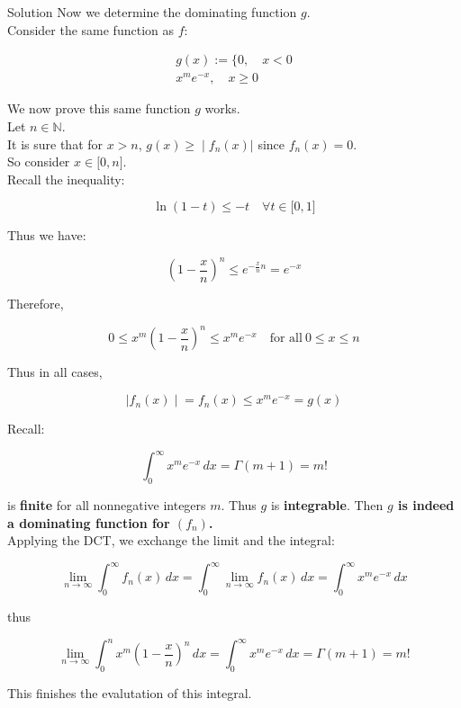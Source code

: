 \begin{qlsolution}{Solution}
Now we determine the dominating function \(g\).\\
Consider the same function as \(f\):

\[\begin{matrix}
{g(x) := \{ 0,\quad x < 0} \\
{x^{m}e^{- x},\quad x \geq 0}
\end{matrix}\]

We now prove this same function \(g\) works.\\
Let \(n \in \mathbb{N}\).\\
It is sure that for \(x > n\), \(\left. g(x) \geq \middle| f_{n}(x)| \right.\) since \(f_{n}(x) = 0\).\\
So consider \(x \in \lbrack 0,n\rbrack\).\\
Recall the inequality:

\[\ln(1 - t) \leq - t\quad\forall t \in \lbrack 0,1\rbrack\]

Thus we have:

\[\left( {1 - \frac{x}{n}} \right)^{n} \leq e^{- \frac{x}{n}n} = e^{- x}\]

Therefore,

\[0 \leq x^{m}\left( {1 - \frac{x}{n}} \right)^{n} \leq x^{m}e^{- x}\quad\text{for all}\ 0 \leq x \leq n\]

Thus in all cases,

\[\left. |f_{n}(x) \middle| = f_{n}(x) \leq x^{m}e^{- x} = g(x) \right.\]

Recall:

\[\int_{0}^{\infty}x^{m}e^{- x}\, dx = \Gamma(m + 1) = m!\]

is \textbf{finite} for all nonnegative integers \(m\). Thus \(g\) is \textbf{integrable}. Then \textbf{\(g\) is indeed a dominating function for \((f_{n})\).}\\
Applying the DCT, we exchange the limit and the integral:

\[\lim\limits_{n\rightarrow\infty}\int_{0}^{\infty}f_{n}(x)\, dx = \int_{0}^{\infty}\lim\limits_{n\rightarrow\infty}f_{n}(x)\, dx = \int_{0}^{\infty}x^{m}e^{- x}\, dx\]

thus

\[\lim\limits_{n\rightarrow\infty}\int_{0}^{n}x^{m}\left( {1 - \frac{x}{n}} \right)^{n}\, dx = \int_{0}^{\infty}x^{m}e^{- x}\, dx = \Gamma(m + 1) = m!\]

This finishes the evalutation of this integral.

\end{qlsolution}

